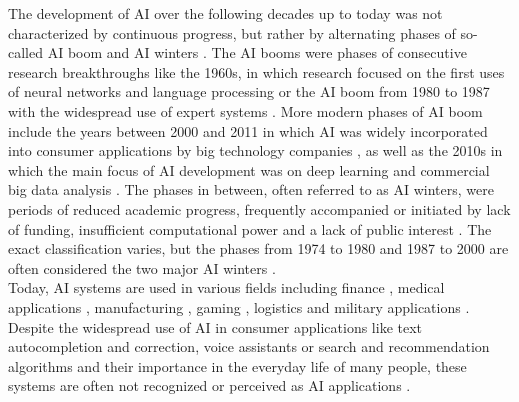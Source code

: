 \documentclass[a4paper, conference]{IEEEtran}
\begin{document}
The development of AI over the following decades up to today was not characterized by continuous progress, but rather by alternating phases of so-called AI boom and AI winters \cite{AiWinterLessons, briefHistory}. The AI booms were phases of consecutive research breakthroughs like the 1960s, in which research focused on the first uses of neural networks and language processing \cite[pp. 65-69]{aiModernApproach} or the AI boom from 1980 to 1987 with the widespread use of expert systems \cite[pp. 71-74]{aiModernApproach}. More modern phases of AI boom include the years between 2000 and 2011 in which AI was widely incorporated into consumer applications by big technology companies \cite{voiceAssistants}, as well as the 2010s in which the main focus of AI development was on deep learning and commercial big data analysis \cite[pp. 77-79, p.5]{aiModernApproach, briefHistory}. The phases in between, often referred to as AI winters, were periods of reduced academic progress, frequently accompanied or initiated by lack of funding, insufficient computational power and a lack of public interest \cite{AiWinterLessons, aiModernApproach}. The exact classification varies, but the phases from 1974 to 1980 and 1987 to 2000 are often considered the two major AI winters \cite{Toosi_2021, aiModernApproach}.\\

Today, AI systems are used in various fields including finance \cite[p. 1845]{aiModernApproach}, medical applications \cite[p. 84]{aiModernApproach}, manufacturing \cite[p. 293]{aiStructuresStrategies}, gaming \cite[pp. 45-46]{aiStructuresStrategies}, logistics \cite[pp. 82-83]{aiModernApproach} and military applications \cite[pp. 86, 1031]{aiModernApproach}. Despite the widespread use of AI in consumer applications like text autocompletion and correction, voice assistants or search and recommendation algorithms and their importance in the everyday life of many people, these systems are often not recognized or perceived as AI applications \cite{studyAIusage}.\\
\end{document}
